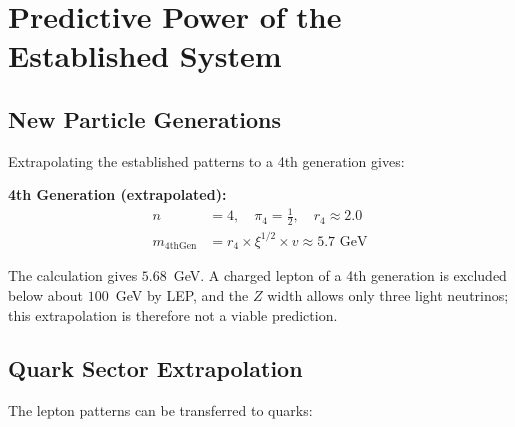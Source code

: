 	\section{Predictive Power of the Established System}
	\label{sec:predictive_power}
	
	\subsection{New Particle Generations}
	\label{subsec:new_generations}
	
	Extrapolating the established patterns to a 4th generation gives:
	
	\textbf{4th Generation (extrapolated):}
	\begin{align}
		n &= 4, \quad \pi_4 = \frac{1}{2}, \quad r_4 \approx 2.0 \\
		m_{\text{4thGen}} &= r_4 \times \xi^{1/2} \times v \approx 5.7 \text{ GeV}
	\end{align}

	The calculation gives $5.68$~GeV. A charged lepton of a 4th generation is excluded below about $100$~GeV by LEP, and the $Z$ width allows only three light neutrinos; this extrapolation is therefore not a viable prediction.
	
	\subsection{Quark Sector Extrapolation}
	\label{subsec:quark_extrapolation}
	
	The lepton patterns can be transferred to quarks:
	
	\begin{table}[H]
		\centering
		\caption{Quark predictions from established patterns}
		\label{tab:quark_predictions}
	\end{table}
	
